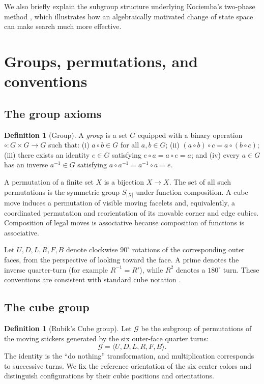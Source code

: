 \documentclass[11pt,a4paper]{article}
\theoremstyle{definition}
\newtheorem{definition}[theorem]{Definition}
\theoremstyle{remark}
\newcommand{\G}{\mathcal{G}}
\begin{document}
We also briefly explain the subgroup structure underlying Kociemba's two-phase method \citep{kociemba2phase}, which illustrates how an algebraically motivated change of state space can make search much more effective.

\section{Groups, permutations, and conventions}
\subsection{The group axioms}
\begin{definition}[Group]
A \emph{group} is a set $G$ equipped with a binary operation $\circ:G\times G\to G$ such that: (i) $a\circ b\in G$ for all $a,b\in G$; (ii) $(a\circ b)\circ c=a\circ(b\circ c)$; (iii) there exists an identity $e\in G$ satisfying $e\circ a=a\circ e=a$; and (iv) every $a\in G$ has an inverse $a^{-1}\in G$ satisfying $a\circ a^{-1}=a^{-1}\circ a=e$.
\end{definition}

A permutation of a finite set $X$ is a bijection $X\to X$. The set of all such permutations is the symmetric group $S_{|X|}$ under function composition. A cube move induces a permutation of visible moving facelets and, equivalently, a coordinated permutation and reorientation of its movable corner and edge cubies. Composition of legal moves is associative because composition of functions is associative.

Let $U,D,L,R,F,B$ denote clockwise $90^\circ$ rotations of the corresponding outer faces, from the perspective of looking toward the face. A prime denotes the inverse quarter-turn (for example $R^{-1}=R'$), while $R^2$ denotes a $180^\circ$ turn. These conventions are consistent with standard cube notation \citep{singmaster1981}.

\subsection{The cube group}
\begin{definition}[Rubik's Cube group]
Let $\G$ be the subgroup of permutations of the moving stickers generated by the six outer-face quarter turns:
\begin{equation}\label{eq:group}
\G=\langle U,D,L,R,F,B\rangle.
\end{equation}
The identity is the ``do nothing'' transformation, and multiplication corresponds to successive turns. We fix the reference orientation of the six center colors and distinguish configurations by their cubie positions and orientations.
\end{definition}
\end{document}
